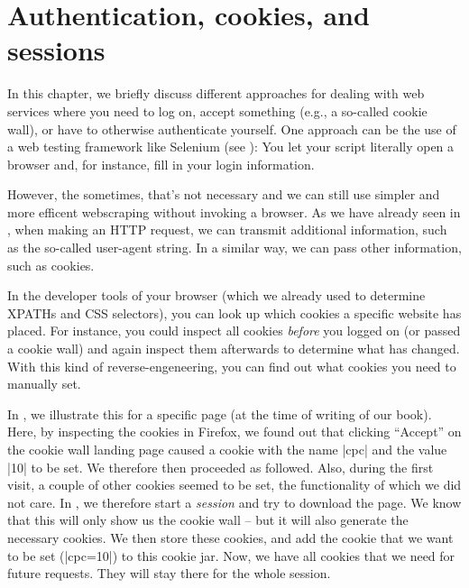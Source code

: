 \section{Authentication, cookies, and sessions}
\label{sec:authentication}


In this chapter, we briefly discuss different approaches for dealing
with web services where you need to log on, accept something (e.g., a
so-called cookie wall), or have to otherwise authenticate yourself.
One approach can be the use of a web testing framework like Selenium
(see ): You let your script literally open a browser
and, for instance, fill in your login information.

However, the sometimes, that's not necessary and we can still use simpler
and more efficent webscraping without invoking a browser. As we have already
seen in , when making an HTTP request, we can transmit
additional information, such as the so-called user-agent string. In a
similar way, we can pass other information, such as cookies.

In the developer tools of your browser (which we already used to determine
XPATHs and CSS selectors), you can look up which cookies a specific website
has placed. For instance, you could inspect all cookies \emph{before} you
logged on (or passed a cookie wall) and again inspect them afterwards to
determine what has changed. With this kind of reverse-engeneering, you
can find out what cookies you need to manually set.

In , we illustrate this for a specific page (at the
time of writing of our book). Here, by inspecting the cookies in Firefox,
we found out that clicking ``Accept'' on the cookie wall landing page
caused a cookie with the name |cpc| and the value |10| to be set. We
therefore then proceeded as followed. Also, during the first visit,
a couple of other cookies seemed to be set, the functionality of which
we did not care. In , we therefore start a \emph{session}
and try to download the page. We know that this will only show us the
cookie wall -- but it will also generate the necessary cookies. We then
store these cookies, and add the cookie that we want to be set (|cpc=10|)
to this cookie jar. Now, we have all cookies that we need for future
requests. They will stay there for the whole session.

